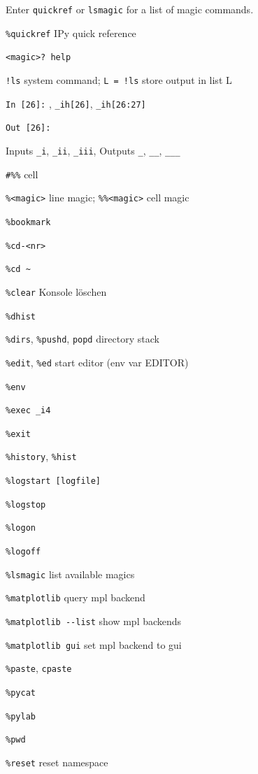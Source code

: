 \documentclass[9pt,a4wide]{extarticle}
\begin{document}
\setlength{\columnsep}{1cm}
\begin{multicols}{3}

Enter {\tt quickref} or {\tt lsmagic} for a list of magic commands.


{\tt \%quickref} \rval IPy quick reference

{\tt <magic>? \rval help}

{\tt !ls} \rval system command; {\tt L = !ls} store output in list L

{\tt In [26]:} , {\tt \_ih[26]}, {\tt \_ih[26:27]}

{\tt Out [26]:} 

Inputs {\tt \_i}, {\tt \_ii}, {\tt \_iii}, 
Outputs {\tt \_}, {\tt \_\_}, {\tt \_\_\_} 

{\tt \#\%\%} \rval  cell

{\tt \%<magic>} \rval line magic; {\tt \%\%<magic>} \rval cell magic

{\tt \%bookmark}

{\tt \%cd-<nr>}

{\tt \%cd \~{}}

{\tt \%clear} \rval Konsole löschen

{\tt \%dhist}

{\tt \%dirs}, {\tt \%pushd}, {\tt popd} \rval directory stack

{\tt \%edit}, {\tt \%ed} start editor (env var EDITOR)

{\tt \%env}

{\tt \%exec \_i4}

{\tt \%exit}

{\tt \%history}, {\tt \%hist}

{\tt \%logstart [logfile]}

{\tt \%logstop}

{\tt \%logon}

{\tt \%logoff}

{\tt \%lsmagic} \rval list available magics

{\tt \%matplotlib} query mpl backend

{\tt \%matplotlib -{}-list} show mpl backends

{\tt \%matplotlib gui} set mpl backend to gui

{\tt \%paste}, {\tt cpaste}

{\tt \%pycat}

{\tt \%pylab}

{\tt \%pwd}

{\tt \%reset} \rval reset namespace


\end{multicols}
\end{document}
